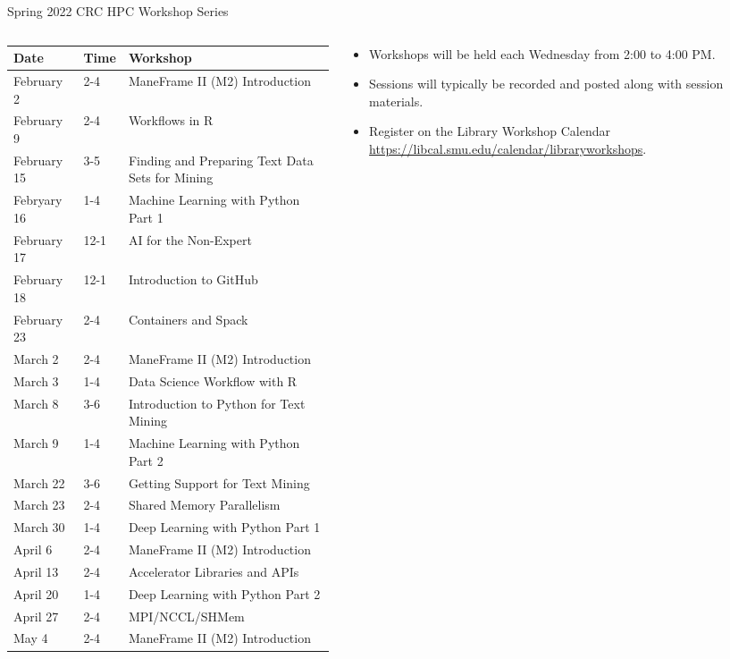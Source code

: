 \begin{frame}{Spring 2022 CRC HPC Workshop Series}
\begin{columns}[c]
\begin{column}{0.5\textwidth}
\begin{table}
\tiny
\begin{tabular}{lll}
\toprule
Date     & Time  & Workshop\\
\midrule
February 2 & 2-4 & ManeFrame II (M2) Introduction \\  
February 9 & 2-4 & Workflows in R \\  
February 15 & 3-5 & Finding and Preparing Text Data Sets for Mining \\
Febryary 16 & 1-4 & Machine Learning with Python Part 1 \\
February 17 & 12-1 & AI for the Non-Expert \\
February 18 & 12-1 & Introduction to GitHub \\        
February 23 & 2-4  & Containers and Spack \\     
March 2   &  2-4 &  ManeFrame II (M2) Introduction \\
March 3   &  1-4 & Data Science Workflow with R \\  
March 8   &  3-6 & Introduction to Python for Text Mining \\ 
March 9   &  1-4 & Machine Learning with Python Part 2 \\ 
March 22  &  3-6 & Getting Support for Text Mining \\  
March 23  &  2-4 & Shared Memory Parallelism \\   
March 30  &  1-4 & Deep Learning with Python Part 1 \\   
April 6   &  2-4 & ManeFrame II (M2) Introduction \\    
April 13  &  2-4 & Accelerator Libraries and APIs \\    
April 20  &  1-4 & Deep Learning with Python Part 2 \\      
April 27  &  2-4 & MPI/NCCL/SHMem \\            
May 4     &  2-4 & ManeFrame II (M2) Introduction \\
\bottomrule
\end{tabular}
\end{table}
\end{column}
\begin{column}{0.5\textwidth}
\begin{itemize}
\item Workshops will be held each Wednesday from 2:00 to 4:00 PM.
\item Sessions will typically be recorded and posted along with session materials.
\item Register on the Library Workshop Calendar
\href{https://libcal.smu.edu/calendar/libraryworkshops}{https://libcal.smu.edu/calendar/libraryworkshops}.
\end{itemize}
\end{column}
\end{columns}
\end{frame}

